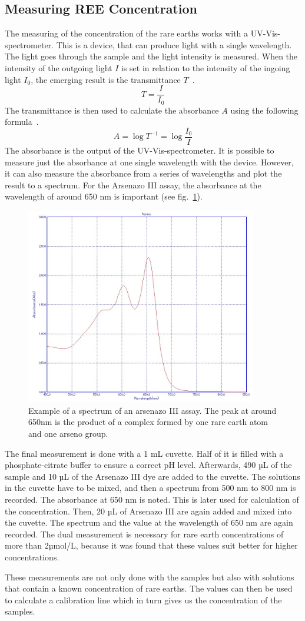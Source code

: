 \subsection{Measuring REE Concentration}
The measuring of the concentration of the rare earths works with a UV-Vis-spectrometer.
This is a device, that can produce light with a single wavelength.
The light goes through the sample and the light intensity is measured.
When the intensity of the outgoing light \(I\) is set in relation to the intensity of the ingoing light \(I_0\), the emerging result is the transmittance \(T\)~\cite{transmittanceformula}.
\[T=\frac{I}{I_0}\]
The transmittance is then used to calculate the absorbance \(A\) using the following formula~\cite{arbsorbanceformula}.
\[A=\log{T^{-1}}=\log{\frac{I_0}{I}}\]
The absorbance is the output of the UV-Vis-spectrometer.
It is possible to measure just the absorbance at one single wavelength with the device.
However, it can also measure the absorbance from a series of wavelengths and plot the result to a spectrum.
For the Arsenazo III assay, the absorbance at the wavelength of around 650 nm is important (see fig.~\ref{fig:example_spectrum}).
\begin{figure}[H]
    \centering
    \includegraphics[width=0.9\textwidth]{./media/images/example_spectrum}
    \caption{Example of a spectrum of an arsenazo III assay. The peak at around 650nm is the product of a complex formed by one rare earth atom and one arseno group.}
    \label{fig:example_spectrum}
\end{figure}

The final measurement is done with a 1 mL cuvette.
Half of it is filled with a phosphate-citrate buffer to ensure a correct pH level.
Afterwards, 490 µL of the sample and 10 µL of the Arsenazo III dye are added to the cuvette.
The solutions in the cuvette have to be mixed, and then a spectrum from 500 nm to 800 nm is recorded.
The absorbance at 650 nm is noted.
This is later used for calculation of the concentration.
Then, 20 µL of Arsenazo III are again added and mixed into the cuvette.
The spectrum and the value at the wavelength of 650 nm are again recorded.
The dual measurement is necessary for rare earth concentrations of more than 2µmol/L, because it was found that these values suit better for higher concentrations.

These measurements are not only done with the samples but also with solutions that contain a known concentration of rare earths.
The values can then be used to calculate a calibration line which in turn gives us the concentration of the samples.